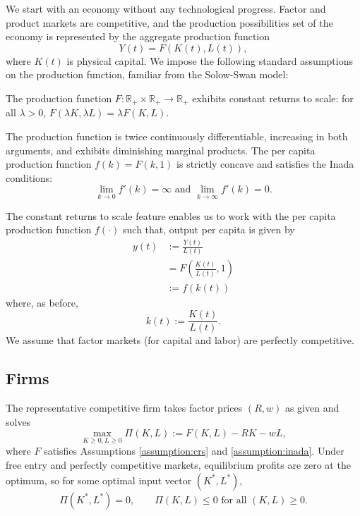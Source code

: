 \documentclass[\topdir/lecture\_notes.tex]{subfiles}
\begin{document}
We start with an economy without any technological progress.
Factor and product markets are competitive, and the production possibilities set of the economy is represented by the aggregate production function
\[
  Y(t)=F(K(t), L(t)),
\]
where $K(t)$ is physical capital.
We impose the following standard assumptions on the production function, familiar from the Solow-Swan model:
\begin{assumption}
  \label{assumption:crs}
  The production function $F: \mathbb{R}_+ \times \mathbb{R}_+ \to \mathbb{R}_+$ exhibits constant returns to scale: for all $\lambda > 0$, $F(\lambda K, \lambda L) = \lambda F(K, L)$.
\end{assumption}

\begin{assumption}
  \label{assumption:inada}
  The production function is twice continuously differentiable, increasing in both arguments, and exhibits diminishing marginal products. The per capita production function $f(k) = F(k, 1)$ is strictly concave and satisfies the Inada conditions:
  \[
    \lim_{k \to 0} f'(k) = \infty \text{ and } \lim_{k \to \infty} f'(k) = 0.
  \]
\end{assumption}

The constant returns to scale feature enables us to work with the per capita production function $f(\cdot)$ such that, output per capita is given by
\[
  \begin{aligned}
    y(t) & := \frac{Y(t)}{L(t)}                \\
         & =F\left(\frac{K(t)}{L(t)}, 1\right) \\
         & := f(k(t))
  \end{aligned}
\]
where, as before,
\[
  k(t) := \frac{K(t)}{L(t)}.
\]
We assume that factor markets (for capital and labor) are perfectly competitive.

\subsection{Firms}

The representative competitive firm takes factor prices $(R,w)$ as given and solves
\begin{equation*}
  \max_{K\ge 0,L\ge 0} \Pi(K,L):=F(K,L)-RK-wL,
\end{equation*}
where $F$ satisfies Assumptions \ref{assumption:crs} and \ref{assumption:inada}.
Under free entry and perfectly competitive markets, equilibrium profits are zero at the optimum, so for some optimal input vector $(K^{*},L^{*})$,
\begin{equation}
  \Pi(K^{*},L^{*})=0,
  \qquad
  \Pi(K,L)\le 0 \text{ for all } (K,L)\ge 0.
  \label{eq:zero-profit-opt}
\end{equation}
\end{document}
